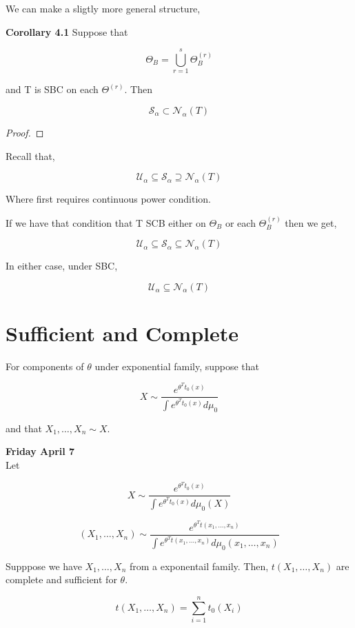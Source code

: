 \documentclass[11pt,fleqn]{book} %
\begin{document}
We can make a sligtly more general structure, 

\textbf{Corollary 4.1} Suppose that

		$$\Theta_B = \bigcup_{r = 1}^s \Theta_B^{(r)} $$

and T is SBC on each $\Theta^{(r)}$. Then 

		$$\mathscr{S}_\alpha \subset \mathscr{N}_\alpha (T) $$

\begin{proof}
	
\end{proof}

Recall that, 

		$$\mathscr{U}_\alpha \subseteq \mathscr{S}_\alpha \supseteq \mathscr{N}_\alpha (T) $$

Where first requires continuous power condition. 

If we have that condition that T SCB either on $\Theta_B$ or each $\Theta_B^{(r)}$ then we get, 

		$$\mathscr{U}_\alpha \subseteq \mathscr{S}_\alpha \subseteq \mathscr{N}_\alpha (T) $$

In either case, under SBC, 

		$$\mathscr{U}_\alpha \subseteq \mathscr{N}_\alpha (T) $$

\section{Sufficient and Complete}

For components of $\theta$ under exponential family, suppose that 

		$$X \sim \frac{e^{\theta^T t_0 (x)}}{\int e^{\theta^T t_0 (x)} d\mu_0} $$

and that $X_1, \dots, X_n \sim X$. 
	


\textbf{Friday April 7}\\


Let 

		$$X \sim \frac{e^{\theta^T t_0(x)}}{\int e^{\theta^T t_0(x)} d\mu_0 (X)} $$

		$$(X_1, \dots, X_n) \sim \frac{e^{\theta^T t(x_1, \dots, x_n)}}{\int e^{\theta^T t(x_1, \dots, x_n)} d\mu_0 (x_1, \dots, x_n)} $$


\begin{theorem}
	Supppose we have $X_1, \dots, X_n$ from a exponentail family. Then, $t(X_1, \dots, X_n)$ are complete and sufficient for $\theta$. 

			$$t(X_1, \dots, X_n) = \sum^n_{i=1} t_0(X_i) $$
\end{theorem}
\end{document}
